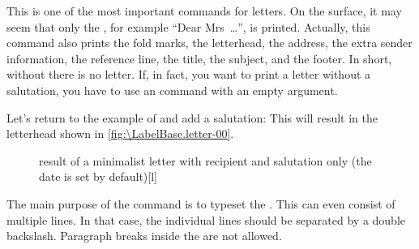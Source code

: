 \begin{Declaration}
\end{Declaration}
This is one of the most important commands for letters. On the surface, it may
seem that only the , for example
``Dear Mrs~\dots'', is printed. Actually, this command
also prints the fold marks, the
letterhead, the address, the extra sender
information, the reference line, the title,
the subject, and the footer. In short,
without  there is no letter. If, in fact, you want to print a
letter without a salutation, you have to use an  command with
an empty argument.

\begin{Example}
  Let's return to the example of
   and add a salutation:
  This will result in the letterhead shown in
  \autoref{fig:\LabelBase.letter-00}.
  \begin{figure}
    \setcapindent{0pt}%
    \begin{captionbeside}{%
        result of a minimalist letter with recipient and salutation only 
        (the date is set by default)}[l]
    \end{captionbeside}
    \label{fig:\LabelBase.letter-00}
  \end{figure}
\end{Example}
\iffalse%
\begin{Explain}
  In the early days of computer-generated letters, a salutation was normally
  omitted, since individualised form letters were hardly possible. Today
  personalised greetings are common in mass mailings.%
\end{Explain}
\fi
%
\EndIndexGroup


\begin{Declaration}
\end{Declaration}
The main purpose of the command  is to typeset the
. This can even consist of multiple
lines. In that case, the individual lines should be separated by a double
backslash. Paragraph breaks inside the  are not
allowed.


